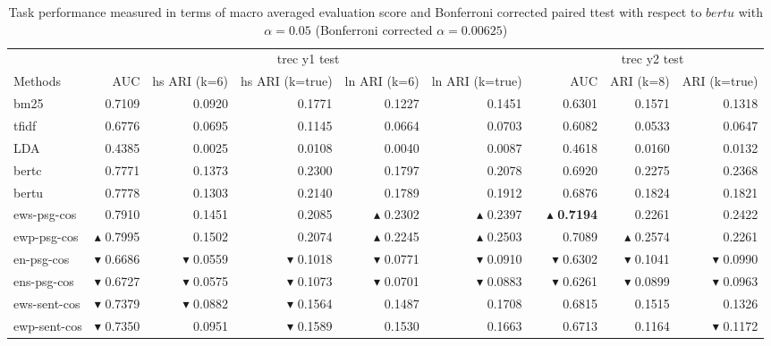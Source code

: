 \begin{small}
\begin{table}[t]
\centering
\caption{Task performance measured in terms of macro averaged evaluation score and Bonferroni corrected paired ttest with respect to $bertu$ with $\alpha = 0.05$ (Bonferroni corrected $\alpha = 0.00625$)}
\label{tab:by1}
\begin{tabular}{@{}lrrrrrrrrr@{}}\toprule
& \multicolumn{5}{c}{trec y1 test} && \multicolumn{3}{c}{trec y2 test}  \\
\cmidrule(r){2-6}
\cmidrule(r){8-10}
Methods & AUC & hs ARI (k=6) & hs ARI (k=true) & ln ARI (k=6) & ln ARI (k=true) && AUC & ARI (k=8) & ARI (k=true) \\\midrule
bm25 & 0.7109 & 0.0920 & 0.1771 & 0.1227 & 0.1451 && 0.6301 & 0.1571 & 0.1318 \\
tfidf & 0.6776 & 0.0695 & 0.1145 & 0.0664 & 0.0703 && 0.6082 & 0.0533 & 0.0647 \\
LDA & 0.4385 & 0.0025 & 0.0108 & 0.0040 & 0.0087 && 0.4618 & 0.0160 & 0.0132 \\
bertc & 0.7771 & 0.1373 & 0.2300 & 0.1797 & 0.2078 && 0.6920 & 0.2275 & 0.2368 \\ 
bertu & 0.7778 & 0.1303 & 0.2140 & 0.1789 & 0.1912 && 0.6876 & 0.1824 & 0.1821 \\\midrule
ews-psg-cos & 0.7910 & 0.1451 & 0.2085 & $\blacktriangle$ 0.2302 & $\blacktriangle$ 0.2397 && $\blacktriangle$ \textbf{0.7194} & 0.2261 & 0.2422 \\ 
ewp-psg-cos & $\blacktriangle$ 0.7995 & 0.1502 & 0.2074 & $\blacktriangle$ 0.2245 & $\blacktriangle$ 0.2503 && 0.7089 & $\blacktriangle$ 0.2574 & 0.2261 \\ 
en-psg-cos & $\blacktriangledown$ 0.6686 & $\blacktriangledown$ 0.0559 & $\blacktriangledown$ 0.1018 & $\blacktriangledown$ 0.0771 & $\blacktriangledown$ 0.0910 && $\blacktriangledown$ 0.6302 & $\blacktriangledown$ 0.1041 & $\blacktriangledown$ 0.0990 \\ 
ens-psg-cos & $\blacktriangledown$ 0.6727 & $\blacktriangledown$ 0.0575 & $\blacktriangledown$ 0.1073 & $\blacktriangledown$ 0.0701 & $\blacktriangledown$ 0.0883 && $\blacktriangledown$ 0.6261 & $\blacktriangledown$ 0.0899 & $\blacktriangledown$ 0.0963 \\\midrule
ews-sent-cos & $\blacktriangledown$ 0.7379 & $\blacktriangledown$ 0.0882 & $\blacktriangledown$ 0.1564 & 0.1487 & 0.1708 && 0.6815 & 0.1515 & 0.1326 \\ 
ewp-sent-cos & $\blacktriangledown$ 0.7350 & 0.0951 & $\blacktriangledown$ 0.1589 & 0.1530 & 0.1663 && 0.6713 & 0.1164 & $\blacktriangledown$ 0.1172 \\ 

\end{tabular}
\end{table}
\end{small}
